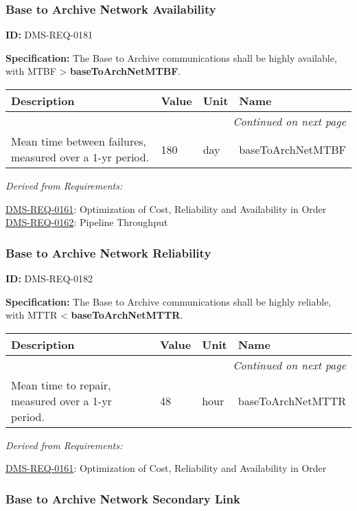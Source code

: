 \documentclass[SE,toc,lsstdraft]{lsstdoc}
\makeatletter
\newcommand{\paramname}[1]{\hspace{0pt}#1}
\newcommand{\unitname}[1]{\hspace{0pt}#1}
\newenvironment{parameters}[0]{%
\setlength\LTleft{0pt}
\setlength\LTright{\fill}
\begin{small}
\begin{longtable}[]{|p{0.5\textwidth}|l|p{0.6in}|p{1.74in}@{}|}

\hline \textbf{Description} & \textbf{Value} & \textbf{Unit} & \textbf{Name} \\ \hline
\endhead

\hline \multicolumn{4}{r}{\emph{Continued on next page}} \\
\endfoot

\hline\hline
\endlastfoot
}{%
\hline
\end{longtable}
\end{small}
}
\makeatother
\begin{document}
\subsubsection{Base to Archive Network Availability}

\label{DMS-REQ-0181}
\textbf{ID:} DMS-REQ-0181

\textbf{Specification: }The Base to Archive communications shall be highly available, with MTBF >  \textbf{baseToArchNetMTBF}.





\begin{parameters}
Mean time between failures, measured over a 1-yr period.
&
180
&
\unitname{%
day
}
&
\paramname{%
baseToArchNetMTBF
} \\\hline
\end{parameters}




\emph{Derived from Requirements:}

\hyperref[DMS-REQ-0161]{DMS-REQ-0161}:
Optimization of Cost, Reliability and Availability in Order \newline
\hyperref[DMS-REQ-0162]{DMS-REQ-0162}:
Pipeline Throughput \newline


\subsubsection{Base to Archive Network Reliability}

\label{DMS-REQ-0182}
\textbf{ID:} DMS-REQ-0182

\textbf{Specification:} The Base to Archive communications shall be highly reliable, with MTTR <  \textbf{baseToArchNetMTTR}.





\begin{parameters}
Mean time to repair, measured over a 1-yr period.
&
48
&
\unitname{%
hour
}
&
\paramname{%
baseToArchNetMTTR
} \\\hline
\end{parameters}




\emph{Derived from Requirements:}

\hyperref[DMS-REQ-0161]{DMS-REQ-0161}:
Optimization of Cost, Reliability and Availability in Order \newline


\subsubsection{Base to Archive Network Secondary Link}
\end{document}
